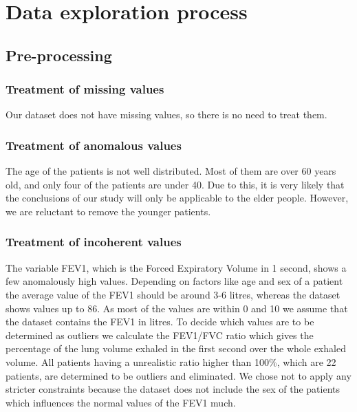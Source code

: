 

\section{Data exploration process}

\subsection{Pre-processing}
\subsubsection{Treatment of missing values}
Our dataset does not have missing values, so there is no need to treat them.
\subsubsection{Treatment of anomalous values}

The age of the patients is not well distributed. Most of them are over 60 years old, and only four of the patients are under 40. Due to this, it is very likely that the conclusions of our study will only be applicable to the elder people. However, we are reluctant to remove the younger patients.

\subsubsection{Treatment of incoherent values} \label{sec-inco-val}
The variable FEV1, which is the Forced Expiratory Volume in 1 second, shows a few anomalously high values. Depending on factors like age and sex of a patient the average value of the FEV1 should be around 3-6 litres, whereas the dataset shows values up to 86. As most of the values are within 0 and 10 we assume that the dataset contains the FEV1 in litres. To decide which values are to be determined as outliers we calculate the FEV1/FVC ratio which gives the percentage of the lung volume exhaled in the first second over the whole exhaled volume. All patients having a unrealistic ratio higher than 100\%, which are 22 patients, are determined to be outliers and eliminated. We chose not to apply any stricter constraints because the dataset does not include the sex of the patients which influences the normal values of the FEV1 much.

